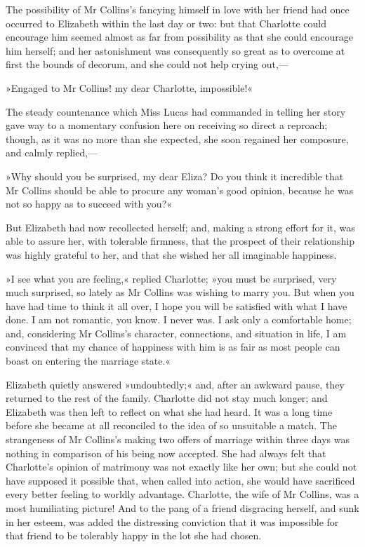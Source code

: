 The possibility of Mr Collins's fancying himself in love with her friend had once occurred to Elizabeth within the last day or two: but that Charlotte could encourage him seemed almost as far from possibility as that she could encourage him herself; and her astonishment was consequently so great as to overcome at first the bounds of decorum, and she could not help crying out,—

»Engaged to Mr Collins! my dear Charlotte, impossible!«

The steady countenance which Miss Lucas had commanded in telling her story gave way to a momentary confusion here on receiving so direct a reproach; though, as it was no more than she expected, she soon regained her composure, and calmly replied,—

»Why should you be surprised, my dear Eliza? Do you think it incredible that Mr Collins should be able to procure any woman's good opinion, because he was not so happy as to succeed with you?«

But Elizabeth had now recollected herself; and, making a strong effort for it, was able to assure her, with tolerable firmness, that the prospect of their relationship was highly grateful to her, and that she wished her all imaginable happiness.

»I see what you are feeling,« replied Charlotte; »you must be surprised, very much surprised, so lately as Mr Collins was wishing to marry you. But when you have had time to think it all over, I hope you will be satisfied with what I have done. I am not romantic, you know. I never was. I ask only a comfortable home; and, considering Mr Collins's character, connections, and situation in life, I am convinced that my chance of happiness with him is as fair as most people can boast on entering the marriage state.«

Elizabeth quietly answered »undoubtedly;« and, after an awkward pause, they returned to the rest of the family. Charlotte did not stay much longer; and Elizabeth was then left to reflect on what she had heard. It was a long time before she became at all reconciled to the idea of so unsuitable a match. The strangeness of Mr Collins's making two offers of marriage within three days was nothing in comparison of his being now accepted. She had always felt that Charlotte's opinion of matrimony was not exactly like her own; but she could not have supposed it possible that, when called into action, she would have sacrificed every better feeling to worldly advantage. Charlotte, the wife of Mr Collins, was a most humiliating picture! And to the pang of a friend disgracing herself, and sunk in her esteem, was added the distressing conviction that it was impossible for that friend to be tolerably happy in the lot she had chosen.